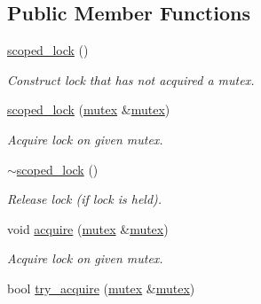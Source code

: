 \subsection*{Public Member Functions}
\begin{DoxyCompactItemize}
\item 
\hypertarget{classtbb_1_1mutex_1_1scoped__lock_a23122745ccd5fc2498fcbbd5ced09e06}{}\hyperlink{classtbb_1_1mutex_1_1scoped__lock_a23122745ccd5fc2498fcbbd5ced09e06}{scoped\+\_\+lock} ()\label{classtbb_1_1mutex_1_1scoped__lock_a23122745ccd5fc2498fcbbd5ced09e06}

\begin{DoxyCompactList}\small\item\em Construct lock that has not acquired a mutex. \end{DoxyCompactList}\item 
\hypertarget{classtbb_1_1mutex_1_1scoped__lock_ab7c2074543443824790433d3d6c3fece}{}\hyperlink{classtbb_1_1mutex_1_1scoped__lock_ab7c2074543443824790433d3d6c3fece}{scoped\+\_\+lock} (\hyperlink{classtbb_1_1mutex}{mutex} \&\hyperlink{classtbb_1_1mutex}{mutex})\label{classtbb_1_1mutex_1_1scoped__lock_ab7c2074543443824790433d3d6c3fece}

\begin{DoxyCompactList}\small\item\em Acquire lock on given mutex. \end{DoxyCompactList}\item 
\hypertarget{classtbb_1_1mutex_1_1scoped__lock_a08c399ee0bb9762039b29e570ec46fe9}{}\hyperlink{classtbb_1_1mutex_1_1scoped__lock_a08c399ee0bb9762039b29e570ec46fe9}{$\sim$scoped\+\_\+lock} ()\label{classtbb_1_1mutex_1_1scoped__lock_a08c399ee0bb9762039b29e570ec46fe9}

\begin{DoxyCompactList}\small\item\em Release lock (if lock is held). \end{DoxyCompactList}\item 
\hypertarget{classtbb_1_1mutex_1_1scoped__lock_a9fce3e2e9f592315dc9c1ada72ae5e3c}{}void \hyperlink{classtbb_1_1mutex_1_1scoped__lock_a9fce3e2e9f592315dc9c1ada72ae5e3c}{acquire} (\hyperlink{classtbb_1_1mutex}{mutex} \&\hyperlink{classtbb_1_1mutex}{mutex})\label{classtbb_1_1mutex_1_1scoped__lock_a9fce3e2e9f592315dc9c1ada72ae5e3c}

\begin{DoxyCompactList}\small\item\em Acquire lock on given mutex. \end{DoxyCompactList}\item 
\hypertarget{classtbb_1_1mutex_1_1scoped__lock_a46f983371aa852d2427ce69f9a571f78}{}bool \hyperlink{classtbb_1_1mutex_1_1scoped__lock_a46f983371aa852d2427ce69f9a571f78}{try\+\_\+acquire} (\hyperlink{classtbb_1_1mutex}{mutex} \&\hyperlink{classtbb_1_1mutex}{mutex})\label{classtbb_1_1mutex_1_1scoped__lock_a46f983371aa852d2427ce69f9a571f78}


\end{DoxyCompactItemize}
